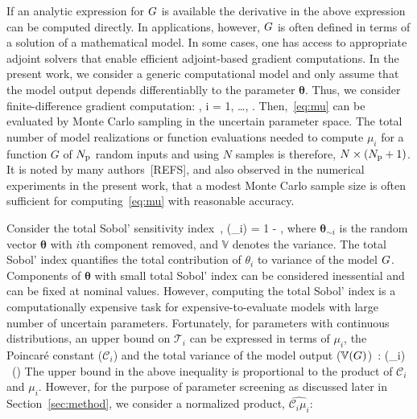 If an analytic expression for $G$ is available the derivative in the above
expression can be computed directly. In applications, however, $G$ is often
defined in terms of a solution of a mathematical model. In some cases, 
one has access to appropriate adjoint solvers that enable efficient
adjoint-based gradient computations. In the present work, we consider
a generic computational model and only assume that the model
output depends differentiablly to the parameter $\bm{\theta}$. Thus, 
we consider finite-difference gradient computation: 
\be
{} 
\approx
{}, \quad i = 1, \ldots, \Np. 
\label{eq:partial}
\ee
Then,~\eqref{eq:mu} can be evaluated by Monte Carlo sampling in
the uncertain parameter space. 
The total number of model realizations or function evaluations
needed to
compute $\mu_i$ for a function $G$ of ${N_\text{p}}$ random inputs and using $N$ samples is
therefore, $N\times({N_\text{p}}+1)$. 
It is noted by many authors~[REFS], and also observed
in the numerical experiments in the present work, that a modest Monte Carlo
sample size is often sufficient for computing~\eqref{eq:mu} with reasonable
accuracy.

Consider the total 
Sobol' sensitivity index~\cite{Sobol:2001},
\be
{}(\theta_i) = 1 - 
,
\label{eq:total}
\ee
where $\bm{\theta}_{\sim i}$ is the random vector $\bm\theta$ with $i$th component removed, 
and $\mathbb{V}$ denotes the variance. The total Sobol' index quantifies the total contribution 
of $\theta_i$ to variance of the model $G$. Components of $\bm\theta$ with small 
total Sobol' index can be considered inessential and can be fixed at nominal values. However, 
computing the total Sobol' index is a computationally expensive task for expensive-to-evaluate 
models with large number of uncertain parameters. Fortunately, 
for parameters with continuous distributions, an upper bound on $\mathcal{T}_i$  
can be expressed in terms of $\mu_i$, the Poincar\'e constant ($\mathcal{C}_i$) and the total 
variance of the model output ($\mathbb{V}(G)$)~\cite{Lamboni:2013}:
\be
{}(\theta_i) \leq {}~(\propto {})
\label{eq:bound}
\ee
The upper bound in the above inequality is proportional to the product of
$\mathcal{C}_i$ and $\mu_i$. However, for the purpose of parameter screening as
discussed later in Section~\ref{sec:method}, we consider a normalized product,
$\widehat{\mathcal{C}_i\mu_i}$:

